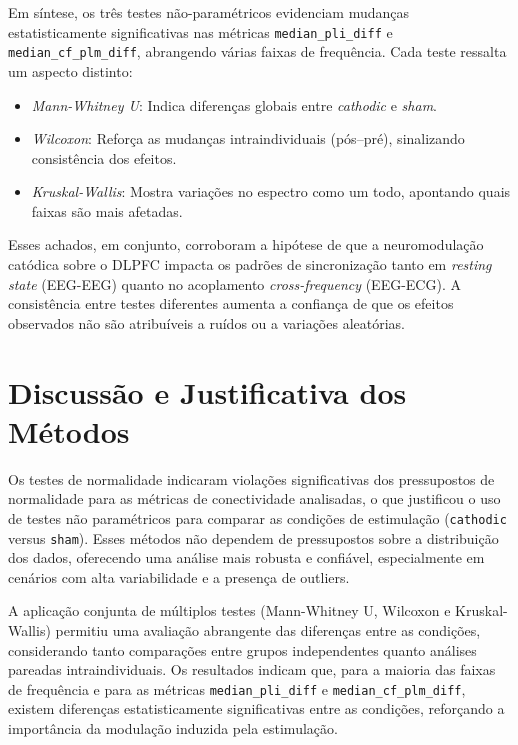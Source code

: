 Em síntese, os três testes não-paramétricos evidenciam mudanças estatisticamente significativas nas métricas \texttt{median\_pli\_diff} e \texttt{median\_cf\_plm\_diff}, abrangendo várias faixas de frequência. Cada teste ressalta um aspecto distinto:
\begin{itemize}
    \item \emph{Mann-Whitney U}: Indica diferenças globais entre \emph{cathodic} e \emph{sham}.
    \item \emph{Wilcoxon}: Reforça as mudanças intraindividuais (pós--pré), sinalizando consistência dos efeitos.
    \item \emph{Kruskal-Wallis}: Mostra variações no espectro como um todo, apontando quais faixas são mais afetadas.
\end{itemize}

Esses achados, em conjunto, corroboram a hipótese de que a neuromodulação catódica sobre o DLPFC impacta os padrões de sincronização tanto em \emph{resting state} (EEG-EEG) quanto no acoplamento \emph{cross-frequency} (EEG-ECG). A consistência entre testes diferentes aumenta a confiança de que os efeitos observados não são atribuíveis a ruídos ou a variações aleatórias.

\section{Discussão e Justificativa dos Métodos}

Os testes de normalidade indicaram violações significativas dos pressupostos de normalidade para as métricas de conectividade analisadas, o que justificou o uso de testes não paramétricos para comparar as condições de estimulação (\texttt{cathodic} versus \texttt{sham}). Esses métodos não dependem de pressupostos sobre a distribuição dos dados, oferecendo uma análise mais robusta e confiável, especialmente em cenários com alta variabilidade e a presença de outliers.

A aplicação conjunta de múltiplos testes (Mann-Whitney U, Wilcoxon e Kruskal-Wallis) permitiu uma avaliação abrangente das diferenças entre as condições, considerando tanto comparações entre grupos independentes quanto análises pareadas intraindividuais. Os resultados indicam que, para a maioria das faixas de frequência e para as métricas \texttt{median\_pli\_diff} e \texttt{median\_cf\_plm\_diff}, existem diferenças estatisticamente significativas entre as condições, reforçando a importância da modulação induzida pela estimulação.

